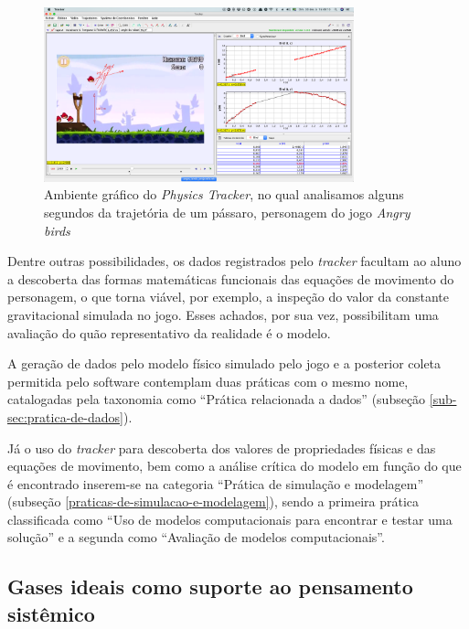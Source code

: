 \begin{figure}[!htb]
  \caption{Ambiente gráfico do \textit{Physics Tracker}, no qual analisamos alguns segundos da trajetória de um pássaro, personagem do jogo \textit{Angry birds}}
  \begin{center}
    \includegraphics[width=0.8\textwidth]{imagens/physics-tracker}
  \end{center}
  \label{fig:physics-tracker}
\end{figure}

Dentre outras possibilidades, os dados registrados pelo \textit{tracker} facultam ao aluno a descoberta das formas matemáticas funcionais das equações de movimento do personagem, o que torna viável, por exemplo, a inspeção do valor da constante gravitacional simulada no jogo. Esses achados, por sua vez, possibilitam uma avaliação do quão representativo da realidade é o modelo. 

A geração de dados pelo modelo físico simulado pelo jogo e a posterior coleta permitida pelo software contemplam duas práticas com o mesmo nome, catalogadas pela taxonomia como ``Prática relacionada a dados'' (subseção \ref{sub-sec:pratica-de-dados}). 

Já o uso do \textit{tracker} para descoberta dos valores de propriedades físicas e das equações de movimento, bem como a análise crítica do modelo em função do que é encontrado inserem-se na categoria ``Prática de simulação e modelagem'' (subseção \ref{praticas-de-simulacao-e-modelagem}), sendo a primeira prática classificada como ``Uso de modelos computacionais para encontrar e testar uma solução''  e a segunda como ``Avaliação de modelos computacionais''.   


\subsection{Gases ideais como suporte ao pensamento sistêmico}
